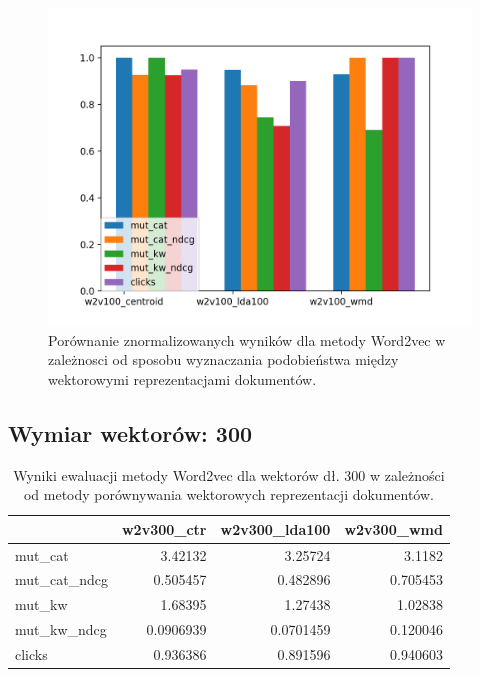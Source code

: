 \documentclass[pl]{minipw} %
\begin{document}
\begin{figure}[H]
	\centering
	\includegraphics[width=1\textwidth]{img/results/w2v100_centroid_w2v100_lda100_w2v100_wmd_.png}
	\caption{Porównanie znormalizowanych wyników dla metody Word2vec w zależnosci od sposobu wyznaczania podobieństwa między wektorowymi reprezentacjami dokumentów.}
\end{figure}

\subsection{Wymiar wektorów: 300}


\begin{table}
	\centering
	\begin{tabular}{lrrr}
		\hline
		&   w2v300\_ctr &   w2v300\_lda100 &   w2v300\_wmd \\
		\hline
		mut\_cat      &    3.42132   &       3.25724   &     3.1182   \\
		mut\_cat\_ndcg &    0.505457  &       0.482896  &     0.705453 \\
		mut\_kw       &    1.68395   &       1.27438   &     1.02838  \\
		mut\_kw\_ndcg  &    0.0906939 &       0.0701459 &     0.120046 \\
		clicks       &    0.936386  &       0.891596  &     0.940603 \\
		\hline
	\end{tabular}
	\caption{Wyniki ewaluacji metody Word2vec dla wektorów dł. 300 w zależności od metody porównywania wektorowych reprezentacji dokumentów.}
\end{table}
\end{document}

